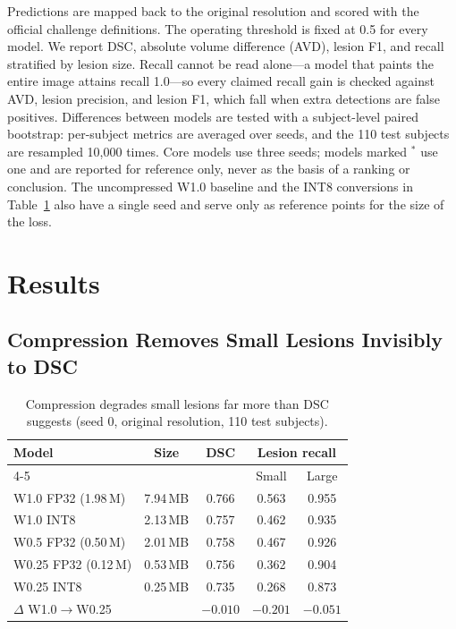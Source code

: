 \documentclass[conference]{IEEEtran}
\begin{document}
Predictions are mapped back to the original resolution and scored with
the official challenge definitions. The operating threshold is fixed at
0.5 for every model. We report DSC, absolute volume difference (AVD), lesion
F1, and recall stratified by lesion size. Recall cannot be read
alone---a model that paints the entire image attains recall 1.0---so
every claimed recall gain is checked against AVD, lesion precision, and
lesion F1, which fall when extra detections are false positives.
Differences between models are tested with a subject-level paired
bootstrap: per-subject metrics are averaged over seeds, and the 110 test
subjects are resampled 10{,}000 times.
Core models use three seeds; models marked $^{*}$ use one and are
reported for reference only, never as the basis of a ranking or
conclusion. The uncompressed W1.0 baseline and the INT8 conversions in
Table~\ref{tab:hidden} also have a single seed and serve only as
reference points for the size of the loss.

\section{Results}

\subsection{Compression Removes Small Lesions Invisibly to DSC}

\begin{table}[t]
\caption{Compression degrades small lesions far more than DSC suggests
(seed 0, original resolution, 110 test subjects).}
\label{tab:hidden}
\centering
\footnotesize
\begin{tabular}{lcccc}
\toprule
Model & Size & DSC & \multicolumn{2}{c}{Lesion recall} \\
\cmidrule(lr){4-5}
      &      &     & Small & Large \\
\midrule
W1.0 FP32 (1.98\,M)  & 7.94\,MB & 0.766 & 0.563 & 0.955 \\
W1.0 INT8            & 2.13\,MB & 0.757 & 0.462 & 0.935 \\
W0.5 FP32 (0.50\,M)  & 2.01\,MB & 0.758 & 0.467 & 0.926 \\
W0.25 FP32 (0.12\,M) & 0.53\,MB & 0.756 & 0.362 & 0.904 \\
W0.25 INT8           & 0.25\,MB & 0.735 & 0.268 & 0.873 \\
\midrule
$\Delta$ W1.0$\to$W0.25 & & $-0.010$ & $\mathbf{-0.201}$ & $-0.051$ \\
\bottomrule
\end{tabular}
\end{table}
\end{document}
